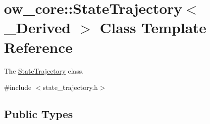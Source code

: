\hypertarget{classow__core_1_1StateTrajectory}{}\section{ow\+\_\+core\+:\+:State\+Trajectory$<$ \+\_\+\+Derived $>$ Class Template Reference}
\label{classow__core_1_1StateTrajectory}


The \hyperlink{classow__core_1_1StateTrajectory}{State\+Trajectory} class.  




{\ttfamily \#include $<$state\+\_\+trajectory.\+h$>$}

\subsection*{Public Types}
